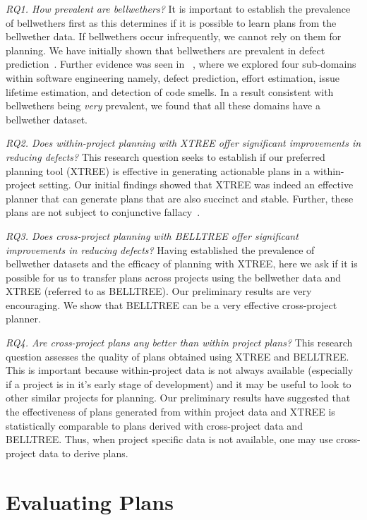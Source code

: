 \documentclass[conference]{IEEEtran}
\theoremstyle{break}
\begin{document}
\noindent\textit{RQ1. How prevalent are bellwethers?}
It is important to establish the prevalence of bellwethers first as this determines if it is possible to learn plans from the bellwether data. If bellwethers occur infrequently, we cannot rely on them for planning. We have initially shown that bellwethers are prevalent in defect prediction~\cite{krishna16}. Further evidence was seen in ~\cite{krishna17b}, where we explored four sub-domains within software engineering namely, defect prediction, effort estimation, issue lifetime estimation, and detection of code smells. In a result consistent with bellwethers being \textit{very} prevalent, we found that all these domains have a bellwether dataset.


\noindent\textit{RQ2. Does within-project planning with XTREE offer significant improvements in reducing defects?}
This research question seeks to establish if our preferred planning tool (XTREE) is effective in generating actionable plans in a within-project setting. Our initial findings showed that XTREE was indeed an effective planner that can generate plans that are also succinct and stable. Further, these plans are not subject to conjunctive fallacy~\cite{krishna17a}.

\noindent\textit{RQ3. Does  cross-project  planning  with  BELLTREE offer significant improvements in reducing defects?}
Having established the prevalence of bellwether datasets and the efficacy of planning with XTREE, here we ask if it is possible for us to transfer plans across projects using the bellwether data and XTREE (referred to as BELLTREE). Our preliminary results are very encouraging. We show that BELLTREE can be a very effective cross-project planner.


\noindent\textit{RQ4. Are cross-project  plans  any  better  than within project plans?}
This research question assesses the quality of plans obtained using XTREE and BELLTREE. This is important because within-project data is not always available (especially if a project is in it's early stage of development) and it may be useful to look to other similar projects for planning. Our preliminary results have suggested that the effectiveness of plans generated from within project data and XTREE is statistically comparable to plans derived with cross-project data and BELLTREE. Thus, when project specific data is not available, one may use cross-project data to derive plans.


\section{Evaluating Plans}
\end{document}

